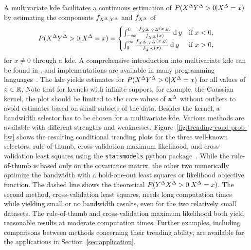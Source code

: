 A multivariate \acf{kde} facilitates a continuous estimation of $P(X^{\Delta} Y^{\Delta} > 0 | X^{\Delta} = x)$ by estimating the components $f_{X^{\Delta}, Y^{\Delta}}$ and $f_{X^{\Delta}}$ of
\begin{align*}
P(X^{\Delta} Y^{\Delta} > 0 | X^{\Delta} = x) = \begin{cases}
                                              \int_{-\infty}^0 \frac{f_{X^{\Delta}, Y^{\Delta}}(x, y)}{f_{X^{\Delta}}(x)} \: \textrm{d} \: y & \text{if } x < 0, \\
                                              \int_{0}^{\infty} \frac{f_{X^{\Delta}, Y^{\Delta}}(x, y)}{f_{X^{\Delta}}(x)} \: \textrm{d} \: y & \text{if } x > 0, \\
\end{cases}
\end{align*}
for $x \neq 0$ through a \ac{kde}.
A comprehensive introduction into multivariate \ac{kde} can be found in \textcite{Gramacki2018}, and implementations are available in many programming languages~\parencite[e.g., for  Python in][]{Seabold2010}.
The \ac{kde} yields estimates for $P(X^{\Delta} Y^{\Delta} > 0 | X^{\Delta} = x)$ for all values of $x \in \mathbb{R}$.
Note that for kernels with infinite support, for example, the Gaussian kernel, the plot should be limited to the core values of $\mathbf{x}^{\Delta}$ without outliers to avoid estimates based on small subsets of the data.
Besides the kernel, a bandwidth selector has to be chosen for a multivariate \ac{kde}.
Various methods are available with different strengths and weaknesses.
Figure~\ref{fig:trending-cond-prob-bw} shows the resulting conditional trending plots for the three well-known selectors, rule-of-thumb, cross-validation maximum likelihood, and cross-validation least squares using the \verb|statsmodels| python package~\parencite{Seabold2010}.
While the rule-of-thumb is based only on the covariance matrix, the other two numerically optimize the bandwidth with a hold-one-out least squares or likelihood objective function.
The dashed line shows the theoretical $P(Y^{\Delta} X^{\Delta} > 0 | X^{\Delta} = x)$.
The second method, cross-validation least squares, needs long computation times while yielding small or no bandwidth results, even for the two relatively small datasets.
The rule-of-thumb and cross-validation maximum likelihood both yield reasonable results at moderate computation times. 
Further examples, including comparisons between methods concerning their trending ability, are available for the applications in Section~\ref{sec:application}.

